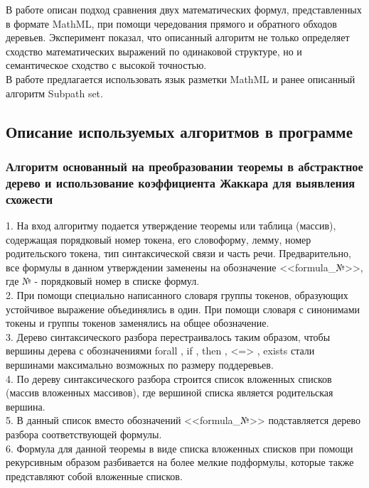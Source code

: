 \documentclass[12pt]{article}
\begin{document}
В работе \cite{Yuping} описан подход сравнения двух математических формул, представленных в формате MathML,  при помощи чередования прямого и обратного обходов деревьев. Эксперимент показал, что описанный алгоритм не только определяет сходство математических выражений по одинаковой структуре, но и семантическое сходство с высокой точностью. \\

В работе \cite{Keisuke Yokoi and Akiko Aizawa} предлагается использовать язык разметки MathML и ранее описанный алгоритм Subpath set.  

\subsection{Описание используемых алгоритмов в программе}
\subsubsection{Алгоритм основанный на преобразовании теоремы в абстрактное дерево и использование коэффициента Жаккара для выявления схожести} 

1. На вход алгоритму подается утверждение теоремы или таблица (массив), содержащая порядковый номер токена, его словоформу, лемму, номер родительского токена, тип синтаксической связи и часть речи. Предварительно, все формулы в данном утверждении заменены на обозначение <<formula\_№>>, где $№$ - порядковый номер в списке формул. \\

2. При помощи специально написанного словаря группы токенов, образующих устойчивое выражение объединялись в один. При помощи словаря с синонимами токены и группы токенов заменялись на общее обозначение. \\

3. Дерево синтаксического разбора перестраивалось таким образом, чтобы вершины дерева с обозначениями forall , if , then , <=> , exists стали вершинами максимально возможных по размеру поддеревьев. \\

4. По дереву синтаксического разбора строится список вложенных списков (массив вложенных массивов), где вершиной списка является родительская вершина. \\

5. В данный список вместо  обозначений <<formula\_№>> подставляется дерево разбора соответствующей формулы. \\

6. Формула для данной теоремы в виде списка вложенных списков при помощи рекурсивным образом разбивается на более мелкие подформулы, которые также представляют собой вложенные списков. \\
\end{document}
